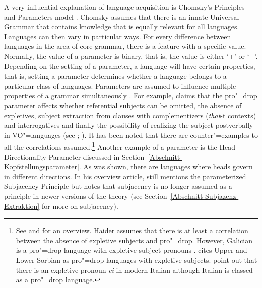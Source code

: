 A very influential explanation of language acquisition is Chomsky's Principles and Parameters model
\citeyearpar{Chomsky81a}. Chomsky assumes that there is an innate Universal Grammar that contains knowledge that is equally relevant for all languages.
Languages can then vary in particular ways. For every difference between languages in the area of core grammar, there is a feature with a specific
value. Normally, the value of a parameter is binary, that is, the value is either `+' or `$-$'.
Depending on the setting of a parameter, a language will have certain properties, that is, setting a parameter determines whether
a language belongs to a particular class of languages.
Parameters are assumed to influence multiple properties of a grammar simultaneously \citep[]{Chomsky81a}. For example, \citet{Rizzi86a} claims
that the pro"=drop parameter affects whether referential subjects can be omitted, the absence of expletives, subject
extraction from clauses with complementizers (\emph{that}-t contexts) and interrogatives and
finally the possibility of realizing the subject postverbally in VO"=languages (see
\citealp[Section~4.3]{Chomsky81a}; \citealp[]{Meisel95a}). It has been noted that there are counter"=examples to all the correlations assumed.\footnote{%
\label{fn-Expletiva-Pro-Drop}%
  See  and  for an overview. Haider assumes that there is at least a correlation
  between the absence of expletive subjects and pro"=drop. However, Galician is a pro"=drop language with expletive subject
  pronouns \citep[Section~2.5]{RU90a-u}. \citet[]{Franks95a-u} cites Upper and Lower Sorbian as pro"=drop
  languages with expletive subjects. \citet[]{SP2002b} point out that there is an expletive pronoun \emph{ci} in modern Italian
  although Italian is classed as a pro"=drop language.}
Another example of a parameter is the Head Directionality Parameter discussed in Section~\ref{Abschnitt-Kopfstellungsparameter}.
As was shown, there are languages where heads govern in different directions. In his overview article, \citet{Haider2001a} still mentions
the parameterized Subjacency Principle but notes that subjacency is no longer assumed as a principle
in newer versions of the theory (see Section~\ref{Abschnitt-Subjazenz-Extraktion} for more on subjacency).

